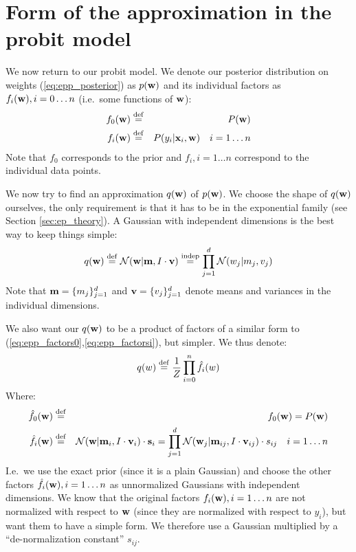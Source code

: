 \documentclass[10pt,a4paper,notitlepage]{article}
\begin{document}
\section{Form of the approximation in the probit model}

We now return to our probit model. We denote our posterior distribution on weights (\ref{eq:epp_posterior}) as $p(\mathbf{w})$ and its individual factors as $f_i(\mathbf{w}), i=0\dots n$ (i.e.\ some functions of $\mathbf{w}$):
\begin{eqnarray}
\label{eq:epp_factors0}
f_0(\mathbf{w}) & \stackrel{\mathrm{def}}{=} & P(\mathbf{w}) \\ 
\label{eq:epp_factorsi}
f_i(\mathbf{w}) & \stackrel{\mathrm{def}}{=} & P(y_i|\mathbf{x}_i, \mathbf{w}) \quad i=1\dots n
\end{eqnarray}
Note that $f_0$ corresponds to the prior and $f_i, i=1\dots n$ correspond to the individual data points.

We now try to find an approximation $q(\mathbf{w})$ of $p(\mathbf{w})$. We choose the shape of $q(\mathbf{w})$ ourselves, the only requirement is that it has to be in the exponential family (see Section \ref{sec:ep_theory}). A Gaussian with independent dimensions is the best way to keep things simple:
\begin{equation}\label{eq:q_def}
q(\mathbf{w}) \stackrel{\mathrm{def}}{=} \mathcal{N}(\mathbf{w}|\mathbf{m}, I\cdot\mathbf{v}) \stackrel{\mathrm{indep}}{=} \prod_{j=1}^d \mathcal{N}(w_j|m_j,v_j)
\end{equation}
Note that $\mathbf{m} = \{m_j\}_{j=1}^d$ and $\mathbf{v}=\{v_j\}_{j=1}^d$ denote means and variances in the individual dimensions.

We also want our $q(\mathbf{w})$ to be a product of factors of a similar form to (\ref{eq:epp_factors0},\ref{eq:epp_factorsi}), but simpler. We thus denote:
\begin{equation}
q(w) \stackrel{\mathrm{def}}{=} \frac{1}{Z} \prod_{i=0}^n \hat{f}_i(w)
\end{equation}
Where:
\begin{eqnarray}
\hat{f}_0(\mathbf{w}) & \stackrel{\mathrm{def}}{=} & f_0(\mathbf{w}) = P(\mathbf{w})  \\ \label{eq:fhat_def} 
\hat{f}_i(\mathbf{w}) & \stackrel{\mathrm{def}}{=} & \mathcal{N}(\mathbf{w}|\mathbf{m}_i,I\cdot\mathbf{v}_i)\cdot \mathbf{s}_i = \prod_{j=1}^d\mathcal{N}(\mathbf{w}_j|\mathbf{m}_{ij},I\cdot\mathbf{v}_{ij})\cdot s_{ij} \quad i=1\dots n
\end{eqnarray}
I.e.\ we use the exact prior (since it is a plain Gaussian) and choose the other factors $\hat{f}_i(\mathbf{w}), i=1\dots n$ as unnormalized Gaussians with independent dimensions. We know that the original factors $f_i(\mathbf{w}), i=1\dots n$ are not normalized with respect to $\mathbf{w}$ (since they are normalized with respect to $y_i$), but want them to have a simple form. We therefore use a Gaussian multiplied by a ``de-normalization constant'' $s_{ij}$.
\end{document}
